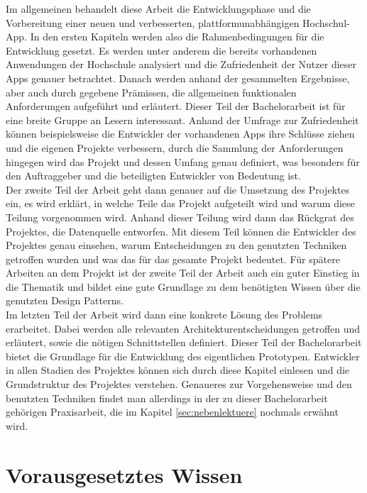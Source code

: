 Im allgemeinen behandelt diese Arbeit die Entwicklungsphase und die Vorbereitung einer neuen und verbesserten, plattformunabhängigen Hochschul-\ac{App}. In den ersten Kapiteln werden also die Rahmenbedingungen für die Entwicklung gesetzt. Es werden unter anderem die bereits vorhandenen Anwendungen der Hochschule analysiert und die Zufriedenheit der Nutzer dieser \acp{App} genauer betrachtet. Danach werden anhand der gesammelten Ergebnisse, aber auch durch gegebene Prämissen, die allgemeinen funktionalen Anforderungen aufgeführt und erläutert. Dieser Teil der Bachelorarbeit ist für eine breite Gruppe an Lesern interessant. Anhand der Umfrage zur Zufriedenheit können beispielsweise die Entwickler der vorhandenen \acp{App} ihre Schlüsse ziehen und die eigenen Projekte verbessern, durch die Sammlung der Anforderungen hingegen wird das Projekt und dessen Umfang genau definiert, was besonders für den Auftraggeber und die beteiligten Entwickler von Bedeutung ist.
\\
\linebreak
Der zweite Teil der Arbeit geht dann genauer auf die Umsetzung des Projektes ein, es wird erklärt, in welche Teile das Projekt aufgeteilt wird und warum diese Teilung vorgenommen wird. Anhand dieser Teilung wird dann das Rückgrat des Projektes, die Datenquelle entworfen. Mit diesem Teil können die Entwickler des Projektes genau einsehen, warum Entscheidungen zu den genutzten Techniken getroffen wurden und was das für das gesamte Projekt bedeutet. Für spätere Arbeiten an dem Projekt ist der zweite Teil der Arbeit auch ein guter Einstieg in die Thematik und bildet eine gute Grundlage zu dem benötigten Wissen über die genutzten Design Patterns. 
\\
\linebreak
Im letzten Teil der Arbeit wird dann eine konkrete Lösung des Problems erarbeitet. Dabei werden alle relevanten Architekturentscheidungen getroffen und erläutert, sowie die nötigen Schnittstellen definiert. Dieser Teil der Bachelorarbeit bietet die Grundlage für die Entwicklung des eigentlichen Prototypen. Entwickler in allen Stadien des Projektes können sich durch diese Kapitel einlesen und die Grundstruktur des Projektes verstehen. Genaueres zur Vorgehensweise und den benutzten Techniken findet man allerdings in der zu dieser Bachelorarbeit gehörigen Praxisarbeit, die im Kapitel \ref{sec:nebenlektuere} nochmals erwähnt wird.

\section{Vorausgesetztes Wissen}

